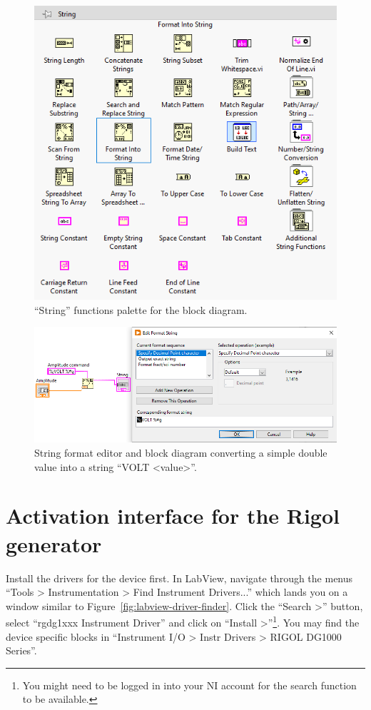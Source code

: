 \documentclass{labo}
\begin{document}
\begin{figure}[ht!]
\centering
\includegraphics[scale=0.8]{functions-palette-fromat-into-string.png}
\caption{“String” functions palette for the block diagram.}
\label{fig:format-into-string}
\end{figure}

\begin{figure}[ht!]
\centering
\includegraphics[width=\textwidth]{format-into-string-edit.png}
\caption{String format editor and block diagram converting a simple double value into a string “VOLT <value>”.}
\label{fig:format-into-string-edit}
\end{figure}



\section{Activation interface for the Rigol generator}
Install the drivers for the device first.
In LabView, navigate through the menus “Tools > Instrumentation > Find Instrument Drivers...” which lands you on a window similar to Figure~\ref{fig:labview-driver-finder}.
Click the “Search >” button, select “rgdg1xxx Instrument Driver” and click on “Install >”\footnote{You might need to be logged in into your NI account for the search function to be available.}.
You may find the device specific blocks in “Instrument I/O > Instr Drivers > RIGOL DG1000 Series”.
\end{document}
